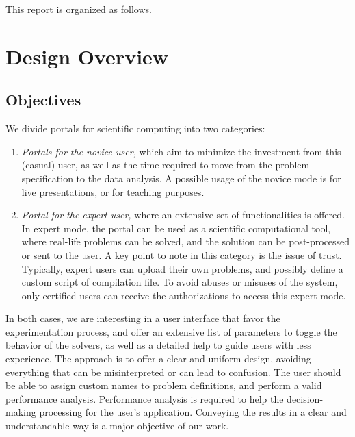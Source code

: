 \documentclass[11pt,relax]{SANDreport}
\begin{document}
\smallskip

This report is organized as follows.

\section{Design Overview}

\subsection{Objectives}

We divide portals for scientific computing into two categories:
\begin{enumerate}
\item {\sl Portals for the novice user,} which aim to minimize the investment
from this (casual) user, as well as the time required to move from the problem
specification to the data analysis. A possible usage of the novice mode is for
live presentations, or for teaching purposes.
\item {\sl Portal for the expert user,} where an extensive set of
functionalities is offered. In expert mode, the portal can be used as a
scientific computational tool, where real-life problems can be solved, and the
solution can be post-processed or sent to the user.
A key point to note in this category is the issue
of trust. Typically, expert users can upload their own problems, and possibly
define a custom script of compilation file. To avoid abuses or misuses of the
system, only certified users can receive the authorizations to access this
expert mode.
\end{enumerate}

In  both cases, we are interesting in a user interface that favor the
experimentation process, and offer an extensive list of parameters to toggle
the behavior of the solvers, as well as a detailed help to guide users with
less experience. The approach is to offer a clear and uniform design, avoiding
everything that can be misinterpreted or can lead to confusion. The user
should be able to assign custom names to problem definitions, and perform 
a valid performance analysis. Performance analysis is required to help the 
decision-making processing for the user's application.  Conveying the
results in a clear and understandable way is a major objective of our work.
\end{document}
